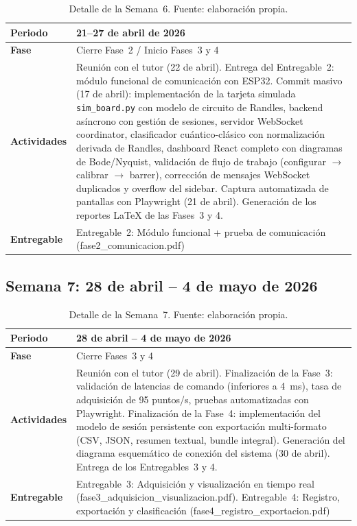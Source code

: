 \documentclass[11pt,a4paper,spanish]{book}
\begin{document}
\begin{table}[ht]
\centering
\begin{tabular}{p{3cm} p{10cm}}
\hline\hline
\textbf{Periodo} & 21--27 de abril de 2026 \\ [0.5ex]
\hline
\textbf{Fase} & Cierre Fase~2 / Inicio Fases~3 y 4 \\ \hline
\textbf{Actividades} & Reuni\'{o}n con el tutor (22 de abril). Entrega del Entregable~2: m\'{o}dulo funcional de comunicaci\'{o}n con ESP32. Commit masivo (17 de abril): implementaci\'{o}n de la tarjeta simulada \texttt{sim\_board.py} con modelo de circuito de Randles, backend as\'{i}ncrono con gesti\'{o}n de sesiones, servidor WebSocket coordinator, clasificador cu\'{a}ntico-cl\'{a}sico con normalizaci\'{o}n derivada de Randles, dashboard React completo con diagramas de Bode/Nyquist, validaci\'{o}n de flujo de trabajo (configurar $\to$ calibrar $\to$ barrer), correcci\'{o}n de mensajes WebSocket duplicados y overflow del sidebar. Captura automatizada de pantallas con Playwright (21 de abril). Generaci\'{o}n de los reportes LaTeX de las Fases~3 y 4. \\ \hline
\textbf{Entregable} & Entregable~2: M\'{o}dulo funcional + prueba de comunicaci\'{o}n (fase2\_comunicacion.pdf) \\ \hline
\end{tabular}
\caption[Semana 6]{Detalle de la Semana~6. Fuente: elaboraci\'{o}n propia.}
\label{tab:semana6}
\end{table}

\subsection{Semana 7: 28 de abril -- 4 de mayo de 2026}

\begin{table}[ht]
\centering
\begin{tabular}{p{3cm} p{10cm}}
\hline\hline
\textbf{Periodo} & 28 de abril -- 4 de mayo de 2026 \\ [0.5ex]
\hline
\textbf{Fase} & Cierre Fases~3 y 4 \\ \hline
\textbf{Actividades} & Reuni\'{o}n con el tutor (29 de abril). Finalizaci\'{o}n de la Fase~3: validaci\'{o}n de latencias de comando (inferiores a 4~ms), tasa de adquisici\'{o}n de 95 puntos/s, pruebas automatizadas con Playwright. Finalizaci\'{o}n de la Fase~4: implementaci\'{o}n del modelo de sesi\'{o}n persistente con exportaci\'{o}n multi-formato (CSV, JSON, resumen textual, bundle integral). Generaci\'{o}n del diagrama esquem\'{a}tico de conexi\'{o}n del sistema (30 de abril). Entrega de los Entregables~3 y 4. \\ \hline
\textbf{Entregable} & Entregable~3: Adquisici\'{o}n y visualizaci\'{o}n en tiempo real (fase3\_adquisicion\_visualizacion.pdf). Entregable~4: Registro, exportaci\'{o}n y clasificaci\'{o}n (fase4\_registro\_exportacion.pdf) \\ \hline
\end{tabular}
\caption[Semana 7]{Detalle de la Semana~7. Fuente: elaboraci\'{o}n propia.}
\label{tab:semana7}
\end{table}
\end{document}
